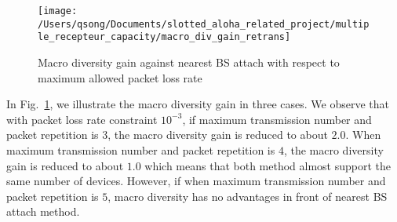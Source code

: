 \begin{figure}
	\centering
	\texttt{[image: /Users/qsong/Documents/slotted\_aloha\_related\_project/multiple\_recepteur\_capacity/macro\_div\_gain\_retrans]}
	\caption{Macro diversity gain against nearest BS attach with respect to maximum allowed packet loss rate}
	\label{fig:macrodivgainretrans}
\end{figure}

In Fig.~\ref{fig:macrodivgainretrans}, we illustrate the macro diversity gain in three cases. We observe that with packet loss rate constraint $10^{-3}$, if maximum transmission number and packet repetition is $3$, the macro diversity gain is reduced to about $2.0$. When maximum transmission number and packet repetition is $4$, the macro diversity gain is reduced to about $1.0$ which means that both method almost support the same number of devices. However, if when maximum transmission number and packet repetition is $5$, macro diversity has no advantages in front of nearest BS attach method.
%



